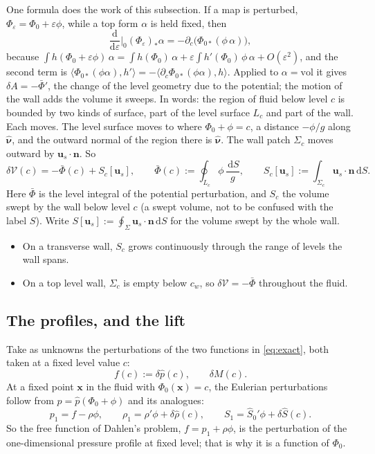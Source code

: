 \documentclass[11pt]{article}
\theoremstyle{definition}
\theoremstyle{remark}
\newcommand{\bu}{\mathbf{u}}
\newcommand{\bn}{\mathbf{n}}
\newcommand{\bx}{\mathbf{x}}
\newcommand{\dS}{\,\mathrm{d}S}
\newcommand{\Vol}{\mathcal V}
\newcommand{\vol}{\mathrm{vol}}
\newcommand{\nuh}{\hat{\boldsymbol{\nu}}}
\begin{document}
One formula does the work of this subsection. If a map is perturbed,
$\Phi_\varepsilon = \Phi_0 + \varepsilon\phi$, while a top form
$\alpha$ is held fixed, then
\begin{equation}
  \frac{\mathrm d}{\mathrm d\varepsilon}\Big|_{0}(\Phi_\varepsilon)_*\alpha
  = -\partial_c\bigl(\Phi_{0*}(\phi\,\alpha)\bigr),
  \label{eq:dpush}
\end{equation}
because $\int h(\Phi_0 + \varepsilon\phi)\,\alpha = \int h(\Phi_0)\,
\alpha + \varepsilon\int h'(\Phi_0)\,\phi\,\alpha + O(\varepsilon^2)$,
and the second term is $\langle\Phi_{0*}(\phi\alpha), h'\rangle =
-\langle\partial_c\Phi_{0*}(\phi\alpha), h\rangle$. Applied to $\alpha =
\vol$ it gives $\delta A = -\bar\Phi'$, the change of the level
geometry due to the potential; the motion of the wall adds the volume
it sweeps. In words: the region of fluid below level $c$ is bounded by
two kinds of surface, part of the level surface $L_c$ and part of the
wall. Each moves. The level surface moves to where $\Phi_0 + \phi =
c$, a distance $-\phi/g$ along $\nuh$, and the outward normal of the
region there is $\nuh$. The wall patch $\Sigma_c$ moves outward by
$\bu_s\cdot\bn$. So
\begin{equation}
  \delta\Vol(c) = -\bar\Phi(c) + S_c[\bu_s],\qquad
  \bar\Phi(c) := \oint_{L_c}\phi\,\frac{\dS}{g},\qquad
  S_c[\bu_s] := \int_{\Sigma_c}\bu_s\cdot\bn\dS .
  \label{eq:dV}
\end{equation}
Here $\bar\Phi$ is the level integral of the potential perturbation,
and $S_c$ the volume swept by the wall below level $c$ (a swept volume,
not to be confused with the label $S$). Write $S[\bu_s] :=
\oint_\Sigma\bu_s\cdot\bn\dS$ for the volume swept by the whole wall.
\begin{itemize}
\item On a transverse wall, $S_c$ grows continuously through the range
  of levels the wall spans.
\item On a top level wall, $\Sigma_c$ is empty below $c_w$, so
  $\delta\Vol = -\bar\Phi$ throughout the fluid.
\end{itemize}

\subsection{The profiles, and the lift}
\label{sec:lift}

Take as unknowns the perturbations of the two functions in
\eqref{eq:exact}, both taken at a fixed level value $c$:
\begin{equation*}
  f(c) := \delta\hat p(c),\qquad \delta M(c) .
\end{equation*}
At a fixed point $\bx$ in the fluid with $\Phi_0(\bx) = c$, the
Eulerian perturbations follow from $p = \hat p(\Phi_0 + \phi)$ and its
analogues:
\begin{equation}
  p_1 = f - \rho\phi,\qquad
  \rho_1 = \rho'\phi + \delta\hat\rho(c),\qquad
  S_1 = \hat S_0'\phi + \delta\hat S(c) .
  \label{eq:eulerian}
\end{equation}
So the free function of Dahlen's problem, $f = p_1 + \rho\phi$, is the
perturbation of the one-dimensional pressure profile at fixed level;
that is why it is a function of $\Phi_0$.
\end{document}
